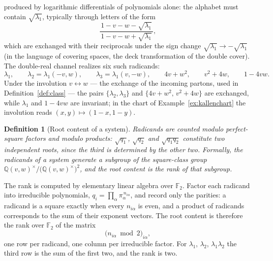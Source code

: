 \documentclass[11pt]{article}
\newcommand{\Q}{\mathbb{Q}}
\newtheorem{definition}{Definition}[section]
\begin{document}
produced by logarithmic differentials of polynomials alone: the
alphabet must contain $\sqrt{\lambda_1}$, typically through letters
of the form
\begin{equation}
  \frac{1 - v - w - \sqrt{\lambda_1}}
       {\,1 - v - w + \sqrt{\lambda_1}\,} ,
\end{equation}
which are exchanged with their reciprocals under the sign change
$\sqrt{\lambda_1} \to -\sqrt{\lambda_1}$ (in the language of
covering spaces, the deck transformation of the double cover).  The
double-real channel realizes six such radicands:
\begin{equation}
  \lambda_1,\qquad
  \lambda_2 = \lambda_1(-v,w),\qquad
  \lambda_3 = \lambda_1(v,-w),\qquad
  4v + w^2,\qquad v^2 + 4w,\qquad 1 - 4vw .
  \label{eq:radicands}
\end{equation}
Under the involution $v \leftrightarrow w$ --- the exchange of the
incoming partons, used in Definition~\ref{def:class} --- the pairs
$\{\lambda_2, \lambda_3\}$ and $\{4v{+}w^2,\, v^2{+}4w\}$ are
exchanged, while $\lambda_1$ and $1-4vw$ are invariant; in the chart
of Example~\ref{ex:kallenchart} the involution reads
$(x,y)\mapsto(1-x,1-y)$.

\begin{definition}[Root content of a system]
Radicands are counted modulo perfect-square factors and modulo
products: $\sqrt{q_1}$, $\sqrt{q_2}$ and $\sqrt{q_1 q_2}$ constitute
\emph{two} independent roots, since the third is determined by the
other two.  Formally, the radicands of a system generate a subgroup
of the square-class group
$\Q(v,w)^\times / \big(\Q(v,w)^\times\big)^2$, and the \emph{root
content} is the rank of that subgroup.
\end{definition}

The rank is computed by elementary linear algebra over
$\mathbb{F}_2$.  Factor each radicand into irreducible polynomials,
$q_i = \prod_\alpha \pi_\alpha^{\,n_{i\alpha}}$, and record only the
parities: a radicand is a square exactly when every $n_{i\alpha}$ is
even, and a product of radicands corresponds to the sum of their
exponent vectors.  The root content is therefore the rank over
$\mathbb{F}_2$ of the matrix
\begin{equation}
  \big(n_{i\alpha} \bmod 2\big)_{i\alpha} ,
\end{equation}
one row per radicand, one column per irreducible factor.  For
$\lambda_1$, $\lambda_2$, $\lambda_1\lambda_2$ the third row is the
sum of the first two, and the rank is two.
\end{document}

